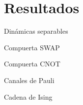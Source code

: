 \section{Resultados}

\begin{frame}{Dinámicas separables}
    \lipsum[1]
\end{frame}

\begin{frame}{Compuerta SWAP}
    \lipsum[1]
\end{frame}

\begin{frame}{Compuerta CNOT}
    \lipsum[1]
\end{frame}

\begin{frame}{Canales de Pauli}
    \lipsum[1]
\end{frame}


\begin{frame}{Cadena de Ising}
    \lipsum[1]
\end{frame}